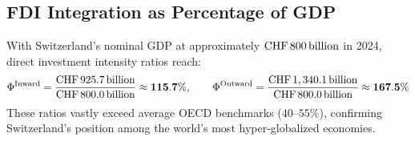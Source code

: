 \subsection{FDI Integration as Percentage of GDP}

With Switzerland's nominal GDP at approximately \textbf{$\text{CHF}\,800\,\text{billion}$} in 2024, direct investment intensity ratios reach:
\begin{equation}
    \Phi^{\text{Inward}} = \frac{\text{CHF}\,925.7\,\text{billion}}{\text{CHF}\,800.0\,\text{billion}} \approx \mathbf{115.7\%}, \qquad \Phi^{\text{Outward}} = \frac{\text{CHF}\,1,340.1\,\text{billion}}{\text{CHF}\,800.0\,\text{billion}} \approx \mathbf{167.5\%}
\end{equation}
These ratios vastly exceed average OECD benchmarks ($40\text{--}55\%$), confirming Switzerland's position among the world's most hyper-globalized economies.
